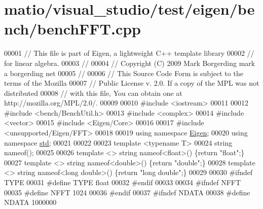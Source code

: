\hypertarget{matio_2visual__studio_2test_2eigen_2bench_2bench_f_f_t_8cpp_source}{}\section{matio/visual\+\_\+studio/test/eigen/bench/bench\+F\+FT.cpp}
\label{matio_2visual__studio_2test_2eigen_2bench_2bench_f_f_t_8cpp_source}

\begin{DoxyCode}
00001 \textcolor{comment}{// This file is part of Eigen, a lightweight C++ template library}
00002 \textcolor{comment}{// for linear algebra.}
00003 \textcolor{comment}{//}
00004 \textcolor{comment}{// Copyright (C) 2009 Mark Borgerding mark a borgerding net}
00005 \textcolor{comment}{//}
00006 \textcolor{comment}{// This Source Code Form is subject to the terms of the Mozilla}
00007 \textcolor{comment}{// Public License v. 2.0. If a copy of the MPL was not distributed}
00008 \textcolor{comment}{// with this file, You can obtain one at http://mozilla.org/MPL/2.0/.}
00009 
00010 \textcolor{preprocessor}{#include <iostream>}
00011 
00012 \textcolor{preprocessor}{#include <bench/BenchUtil.h>}
00013 \textcolor{preprocessor}{#include <complex>}
00014 \textcolor{preprocessor}{#include <vector>}
00015 \textcolor{preprocessor}{#include <Eigen/Core>}
00016 
00017 \textcolor{preprocessor}{#include <unsupported/Eigen/FFT>}
00018 
00019 \textcolor{keyword}{using namespace }\hyperlink{namespace_eigen}{Eigen};
00020 \textcolor{keyword}{using namespace }\hyperlink{namespacestd}{std};
00021 
00022 
00023 \textcolor{keyword}{template} <\textcolor{keyword}{typename} T>
00024 \textcolor{keywordtype}{string} nameof();
00025 
00026 \textcolor{keyword}{template} <> \textcolor{keywordtype}{string} nameof<float>() \{\textcolor{keywordflow}{return} \textcolor{stringliteral}{"float"};\}
00027 \textcolor{keyword}{template} <> \textcolor{keywordtype}{string} nameof<double>() \{\textcolor{keywordflow}{return} \textcolor{stringliteral}{"double"};\}
00028 \textcolor{keyword}{template} <> \textcolor{keywordtype}{string} nameof<long double>() \{\textcolor{keywordflow}{return} \textcolor{stringliteral}{"long double"};\}
00029 
00030 \textcolor{preprocessor}{#ifndef TYPE}
00031 \textcolor{preprocessor}{#define TYPE float}
00032 \textcolor{preprocessor}{#endif}
00033 
00034 \textcolor{preprocessor}{#ifndef NFFT}
00035 \textcolor{preprocessor}{#define NFFT 1024}
00036 \textcolor{preprocessor}{#endif}
00037 \textcolor{preprocessor}{#ifndef NDATA}
00038 \textcolor{preprocessor}{#define NDATA 1000000}

\end{DoxyCode}
